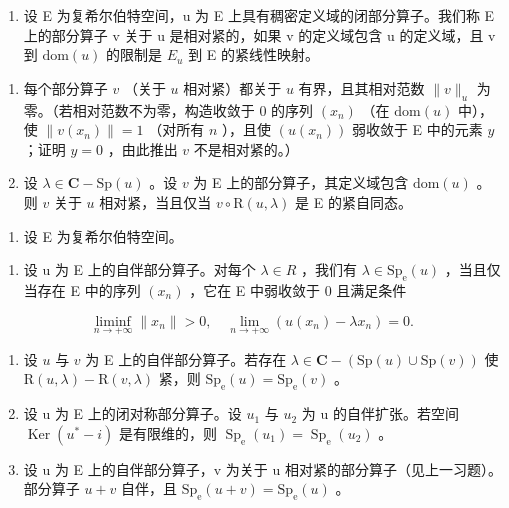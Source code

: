 \begin{enumerate}
\def\labelenumi{\arabic{enumi})}
\setcounter{enumi}{41}
\tightlist
\item
  设 E 为复希尔伯特空间，u 为 E 上具有稠密定义域的闭部分算子。我们称 E 上的部分算子 v 关于 u 是相对紧的，如果 v 的定义域包含 u 的定义域，且 v 到 \(\text{dom}(u)\) 的限制是 \(E_{u}\) 到 E 的紧线性映射。
\end{enumerate}

\begin{enumerate}
\def\labelenumi{\alph{enumi})}
\item
  每个部分算子 \(v\) （关于 \(u\) 相对紧）都关于 \(u\) 有界，且其相对范数 \(\| v \|_u\) 为零。（若相对范数不为零，构造收敛于 0 的序列 \((x_n)\) （在 \(\text{dom}(u)\) 中），使 \(\| v(x_n) \| = 1\) （对所有 \(n\) ），且使 \((u(x_n))\) 弱收敛于 E 中的元素 \(y\) ；证明 \(y = 0\) ，由此推出 \(v\) 不是相对紧的。）
\item
  设 \(\lambda \in \mathbf{C} - \mathrm{Sp}(u)\) 。设 \(v\) 为 E 上的部分算子，其定义域包含 \(\mathrm{dom}(u)\) 。则 \(v\) 关于 \(u\) 相对紧，当且仅当 \(v \circ \mathrm{R}(u, \lambda)\) 是 E 的紧自同态。
\end{enumerate}

\begin{enumerate}
\def\labelenumi{\arabic{enumi})}
\setcounter{enumi}{42}
\tightlist
\item
  设 E 为复希尔伯特空间。
\end{enumerate}

\begin{enumerate}
\def\labelenumi{\alph{enumi})}
\tightlist
\item
  设 u 为 E 上的自伴部分算子。对每个 \(\lambda \in R\) ，我们有 \(\lambda \in \mathrm{Sp}_{\mathrm{e}}(u)\) ，当且仅当存在 E 中的序列 \((x_{n})\) ，它在 E 中弱收敛于 0 且满足条件
\end{enumerate}

\[
\liminf _ {n \to + \infty} \| x _ {n} \| > 0, \quad \lim _ {n \to + \infty} (u (x _ {n}) - \lambda x _ {n}) = 0.
\]

\begin{enumerate}
\def\labelenumi{\alph{enumi})}
\setcounter{enumi}{1}
\item
  设 \(u\) 与 \(v\) 为 E 上的自伴部分算子。若存在 \(\lambda \in \mathbf{C} - (\mathrm{Sp}(u) \cup \mathrm{Sp}(v))\) 使 \(\mathrm{R}(u, \lambda) - \mathrm{R}(v, \lambda)\) 紧，则 \(\mathrm{Sp}_{\mathrm{e}}(u) = \mathrm{Sp}_{\mathrm{e}}(v)\) 。
\item
  设 u 为 E 上的闭对称部分算子。设 \(u_{1}\) 与 \(u_{2}\) 为 u 的自伴扩张。若空间 \(\operatorname{Ker}(u^{*}-i)\) 是有限维的，则 \(\operatorname{Sp}_{\mathrm{e}}(u_{1})=\operatorname{Sp}_{\mathrm{e}}(u_{2})\) 。
\item
  设 u 为 E 上的自伴部分算子，v 为关于 u 相对紧的部分算子（见上一习题）。部分算子 \(u + v\) 自伴，且 \(\mathrm{Sp}_{\mathrm{e}}(u + v) = \mathrm{Sp}_{\mathrm{e}}(u)\) 。
\end{enumerate}

